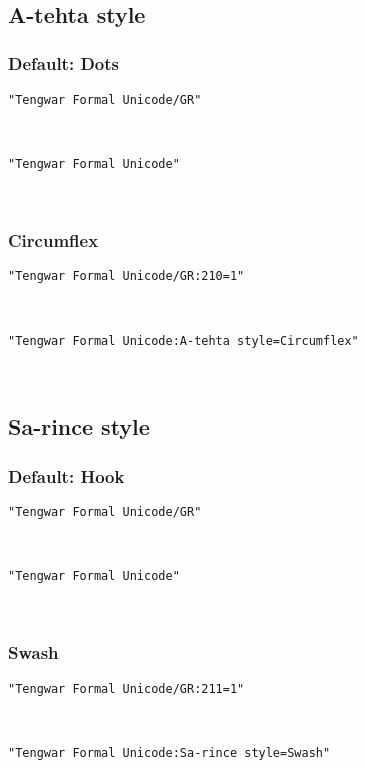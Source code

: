 \documentclass[11pt,a4paper]{article}
\begin{document}
\formalAATtilde 


\subsection{A-tehta style}

\subsubsection{Default: Dots}

\texttt{"Tengwar Formal Unicode/GR"}

\formalGR 

\noindent \texttt{"Tengwar Formal Unicode"}

\formalAAT 

\subsubsection{Circumflex}

\texttt{"Tengwar Formal Unicode/GR:210=1"}

\formalGRcircumflex 

\noindent \texttt{"Tengwar Formal Unicode:A-tehta style=Circumflex"}

\formalAATcircumflex 


\subsection{Sa-rince style}

\subsubsection{Default: Hook}

\texttt{"Tengwar Formal Unicode/GR"}

\formalGR 

\noindent \texttt{"Tengwar Formal Unicode"}

\formalAAT 

\subsubsection{Swash}

\texttt{"Tengwar Formal Unicode/GR:211=1"}

\formalGRswash 

\noindent \texttt{"Tengwar Formal Unicode:Sa-rince style=Swash"}
\end{document}
